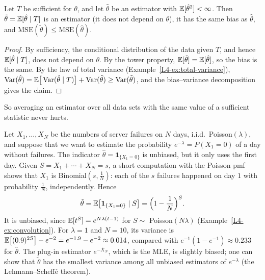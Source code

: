 \begin{theorem}\label{L4-thm:rao-blackwell}
    Let $T$ be sufficient for $\theta$, and let $\hat\theta$ be an estimator with $\mathbb{E}[\hat\theta^2] < \infty$. Then $\tilde\theta = \mathbb{E}[\hat\theta \mid T]$ is an estimator (it does not depend on $\theta$), it has the same bias as $\hat\theta$, and $\mathrm{MSE}(\tilde\theta) \leq \mathrm{MSE}(\hat\theta)$.
\end{theorem}

\begin{proof}
    By sufficiency, the conditional distribution of the data given $T$, and hence $\mathbb{E}[\hat\theta \mid T]$, does not depend on $\theta$. By the tower property, $\mathbb{E}[\tilde\theta] = \mathbb{E}[\hat\theta]$, so the bias is the same. By the law of total variance (Example~\ref{L4-ex:total-variance}), $\operatorname{Var}(\hat\theta) = \mathbb{E}\big[\operatorname{Var}(\hat\theta \mid T)\big] + \operatorname{Var}(\tilde\theta) \geq \operatorname{Var}(\tilde\theta)$, and the bias--variance decomposition gives the claim.
\end{proof}

So averaging an estimator over all data sets with the same value of a sufficient statistic never hurts.

\begin{example}\label{L4-ex:rao-blackwell}
    Let $X_1, \ldots, X_N$ be the numbers of server failures on $N$ days, i.i.d.\ Poisson$(\lambda)$, and suppose that we want to estimate the probability $e^{-\lambda} = P(X_1 = 0)$ of a day without failures. The indicator $\hat\theta = \mathbf{1}_{\{X_1 = 0\}}$ is unbiased, but it only uses the first day. Given $S = X_1 + \cdots + X_N = s$, a short computation with the Poisson pmf shows that $X_1$ is Binomial$(s, \frac{1}{N})$: each of the $s$ failures happened on day $1$ with probability $\frac{1}{N}$, independently. Hence
    \[\tilde\theta = \mathbb{E}\big[\mathbf{1}_{\{X_1 = 0\}} \mid S\big] = \Big(1 - \frac{1}{N}\Big)^S.\]
    It is unbiased, since $\mathbb{E}[t^S] = e^{N\lambda(t - 1)}$ for $S \sim$ Poisson$(N\lambda)$ (Example~\ref{L4-ex:convolution}). For $\lambda = 1$ and $N = 10$, its variance is $\mathbb{E}\big[(0.9)^{2S}\big] - e^{-2} = e^{-1.9} - e^{-2} \approx 0.014$, compared with $e^{-1}(1 - e^{-1}) \approx 0.233$ for $\hat\theta$. The plug-in estimator $e^{-\bar X_N}$, which is the MLE, is slightly biased; one can show that $\tilde\theta$ has the smallest variance among all unbiased estimators of $e^{-\lambda}$ (the Lehmann--Scheff\'e theorem).
\end{example}

